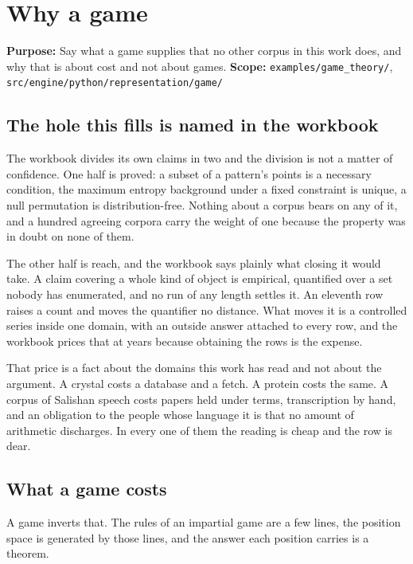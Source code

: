 \chapter{Why a game}

\textbf{Purpose:} Say what a game supplies that no other corpus in this work does, and why that is
about cost and not about games. \textbf{Scope:} \texttt{examples/\allowbreak{}game\_\allowbreak{}theory/\allowbreak{}},
\texttt{src/\allowbreak{}engine/\allowbreak{}python/\allowbreak{}representation/\allowbreak{}game/\allowbreak{}}

\section{The hole this fills is named in the workbook}

The workbook divides its own claims in two and the division is not a matter of confidence. One half
is proved: a subset of a pattern's points is a necessary condition, the maximum entropy background
under a fixed constraint is unique, a null permutation is distribution-free. Nothing about a corpus
bears on any of it, and a hundred agreeing corpora carry the weight of one because the property was
in doubt on none of them.

The other half is reach, and the workbook says plainly what closing it would take. A claim covering
a whole kind of object is empirical, quantified over a set nobody has enumerated, and no run of any
length settles it. An eleventh row raises a count and moves the quantifier no distance. What moves
it is a controlled series inside one domain, with an outside answer attached to every row, and the
workbook prices that at years because obtaining the rows is the expense.

That price is a fact about the domains this work has read and not about the argument. A crystal costs
a database and a fetch. A protein costs the same. A corpus of Salishan speech costs papers held
under terms, transcription by hand, and an obligation to the people whose language it is that no
amount of arithmetic discharges. In every one of them the reading is cheap and the row is dear.

\section{What a game costs}

A game inverts that. The rules of an impartial game are a few lines, the position space is generated
by those lines, and the answer each position carries is a theorem.

